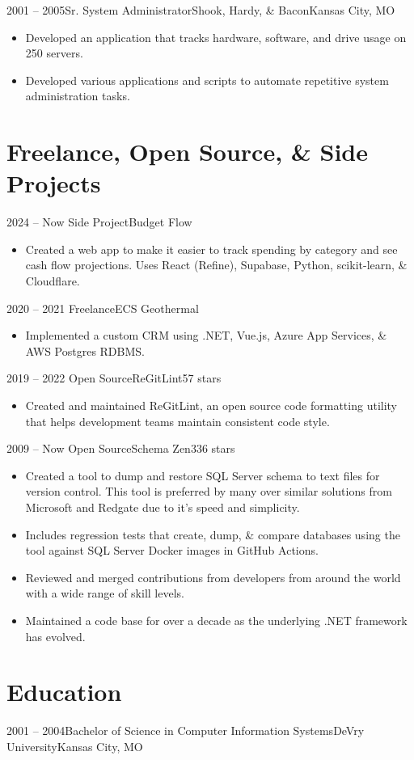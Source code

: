 \documentclass[11pt,letterpaper,final]{moderncv}
\begin{document}
	\cventry
{2001 -- 2005}{Sr. System Administrator}{Shook, Hardy, \& Bacon}{Kansas City, MO}{}{
		\begin{itemize}
			\item
				Developed an application that tracks hardware, software, and
				drive usage on 250 servers.
			\item
				Developed various applications and scripts to automate
				repetitive system administration tasks.
		\end{itemize}
}
\linebreak

\section{Freelance, Open Source, \& Side Projects} 
	\cventry
{2024 -- Now} {Side Project}{Budget Flow}{}{}{
		\begin{itemize}
			\item 
				Created a web app to make it easier to track spending by
				category and see cash flow projections. Uses React (Refine),
				Supabase, Python, scikit-learn, \& Cloudflare.
		\end{itemize}
}
\linebreak

	\cventry
{2020 -- 2021} {Freelance}{ECS Geothermal}{}{}{
		\begin{itemize}
			\item 
				Implemented a custom CRM using .NET, Vue.js, Azure App Services,
				\& AWS Postgres RDBMS.
		\end{itemize}
}
\linebreak

	\cventry
{2019 -- 2022} {Open Source}{ReGitLint}{}{57 stars}{
		\begin{itemize}
			\item 
				Created and maintained ReGitLint, an open source code formatting
				utility that helps development teams maintain consistent code
				style.
		\end{itemize}
}
\linebreak

	\cventry
{2009 -- Now } {Open Source}{Schema Zen}{}{336 stars}{
		\begin{itemize}
			\item 
				Created a tool to dump and restore SQL Server schema to text
				files for version control. This tool is preferred by many over
				similar solutions from Microsoft and Redgate due to it's speed
				and simplicity.
			\item 
				Includes regression tests that create, dump, \& compare
				databases using the tool against SQL Server Docker images in
				GitHub Actions.
			\item 
				Reviewed and merged contributions from developers from around the world
				with a wide range of skill levels.
			\item 
				Maintained a code base for over a decade as the underlying .NET
				framework has evolved.
		\end{itemize}
}
\linebreak


\section{Education} 
	\cventry
{2001 -- 2004}{Bachelor of Science in Computer Information Systems}{DeVry University}{Kansas City, MO}{}{}
\end{document}
